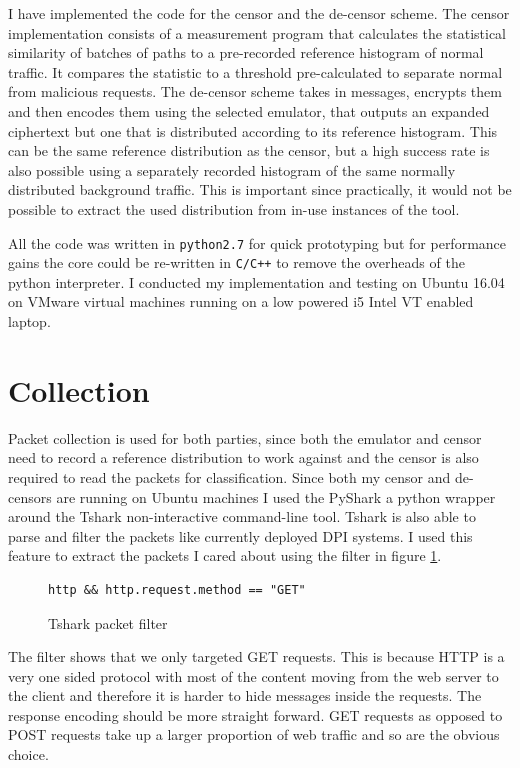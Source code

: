 \documentclass[ %
                    author={Samuel Russell},
                supervisor={Prof. Bogdan Warinschi},
                    degree={MEng},
                     title={Innocuous Ciphertexts},
                  subtitle={The DE-CENSOR Scheme},
                      type={research},
                      year={2018} ]{dissertation}
\begin{document}
I have implemented the code for the censor and the de-censor scheme. The censor implementation consists of a measurement program that calculates the statistical similarity of batches of paths to a pre-recorded reference histogram of normal traffic. It compares the statistic to a threshold pre-calculated to separate normal from malicious requests. The de-censor scheme takes in messages, encrypts them and then encodes them using the selected emulator, that outputs an expanded ciphertext but one that is distributed according to its reference histogram. This can be the same reference distribution as the censor, but a high success rate is also possible using a separately recorded histogram of the same normally distributed background traffic. This is important since practically, it would not be possible to extract the used distribution from in-use instances of the tool.


All the code was written in \texttt{python2.7} for quick prototyping but for performance gains the core could be re-written in \texttt{C/C++} to remove the overheads of the python interpreter. I conducted my implementation and testing on Ubuntu 16.04 on VMware virtual machines running on a low powered i5 Intel VT enabled laptop.

\section{Collection}

Packet collection is used for both parties, since both the emulator and censor need to record a reference distribution to work against and the censor is also required to read the packets for classification. Since both my censor and de-censors are running on Ubuntu machines I used the PyShark a python wrapper around the Tshark non-interactive command-line tool. Tshark is also able to parse and filter the packets like currently deployed DPI systems. I used this feature to extract the packets I cared about using the filter in figure \ref{fig:filter}.

\begin{figure}[h]
\begin{verbatim}
http && http.request.method == "GET"
\end{verbatim}
\caption{Tshark packet filter}
\label{fig:filter}
\end{figure}

The filter shows that we only targeted GET requests. This is because HTTP is a very one sided protocol with most of the content moving from the web server to the client and therefore it is harder to hide messages inside the requests. The response encoding should be more straight forward. GET requests as opposed to POST requests take up a larger proportion of web traffic and so are the obvious choice. 
\end{document}
